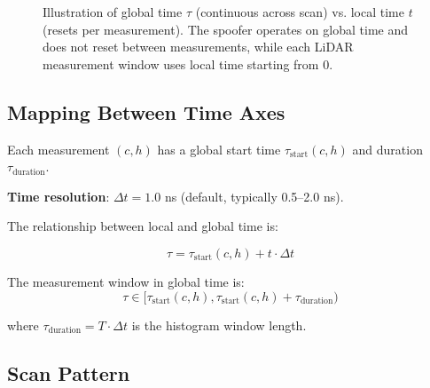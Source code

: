 \documentclass[11pt]{article}
\begin{document}
\begin{figure}[h]
\caption{Illustration of global time $\tau$ (continuous across scan) vs. local time $t$ (resets per measurement). The spoofer operates on global time and does not reset between measurements, while each LiDAR measurement window uses local time starting from 0.}
\end{figure}

\subsection{Mapping Between Time Axes}

Each measurement $(c, h)$ has a global start time $\tau_{\text{start}}(c, h)$ and duration $\tau_{\text{duration}}$.

\textbf{Time resolution}: $\Delta t = 1.0$ ns (default, typically 0.5--2.0 ns).

The relationship between local and global time is:

\begin{equation}
\tau = \tau_{\text{start}}(c, h) + t \cdot \Delta t
\end{equation}

The measurement window in global time is:
\begin{equation}
\tau \in [\tau_{\text{start}}(c, h), \tau_{\text{start}}(c, h) + \tau_{\text{duration}})
\end{equation}

where $\tau_{\text{duration}} = T \cdot \Delta t$ is the histogram window length.

\subsection{Scan Pattern}
\end{document}
